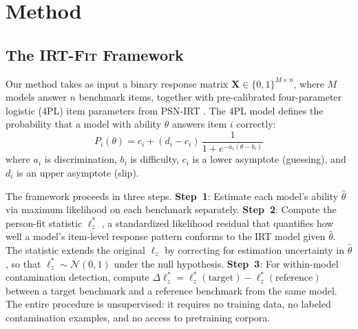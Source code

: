 \section{Method}
\label{sec:method}

\subsection{The \textsc{IRT-Fit} Framework}
\label{sec:framework}

Our method takes as input a binary response matrix $\mathbf{X} \in \{0,1\}^{M \times n}$, where $M$ models answer $n$ benchmark items, together with pre-calibrated four-parameter logistic (4PL) item parameters from PSN-IRT \citep{psnirt2026}.
The 4PL model defines the probability that a model with ability $\theta$ answers item $i$ correctly:
\begin{equation}
  P_i(\theta) = c_i + (d_i - c_i)\,\frac{1}{1 + e^{-a_i(\theta - b_i)}}
  \label{eq:4pl}
\end{equation}
where $a_i$ is discrimination, $b_i$ is difficulty, $c_i$ is a lower asymptote (guessing), and $d_i$ is an upper asymptote (slip).

The framework proceeds in three steps.
\textbf{Step~1}: Estimate each model's ability $\hat{\theta}$ via maximum likelihood on each benchmark separately.
\textbf{Step~2}: Compute the person-fit statistic $\ell_z^*$ \citep{snijders2001}, a standardized likelihood residual that quantifies how well a model's item-level response pattern conforms to the IRT model given $\hat{\theta}$.
The statistic extends the original $\ell_z$ \citep{drasgow1985} by correcting for estimation uncertainty in $\hat{\theta}$, so that $\ell_z^* \sim \mathcal{N}(0,1)$ under the null hypothesis.
\textbf{Step~3}: For within-model contamination detection, compute $\Delta\ell_z^* = \ell_z^*(\text{target}) - \ell_z^*(\text{reference})$ between a target benchmark and a reference benchmark from the same model.
The entire procedure is unsupervised: it requires no training data, no labeled contamination examples, and no access to pretraining corpora.

